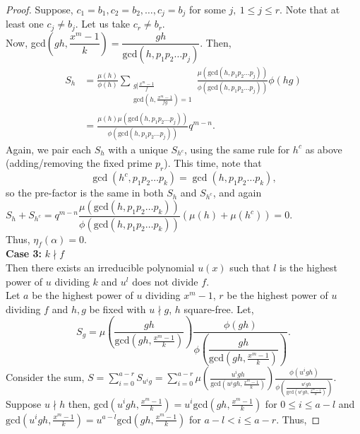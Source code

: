 \documentclass[12pt,a4paper]{article}
\theoremstyle{plain}
\theoremstyle{definition}
\numberwithin{equation}{section}
\begin{document}
\begin{proof}
        Suppose, $c_1=b_1, c_2 = b_2, \dots, c_j=b_j$ for some $j,~1\leq j \leq r$. Note that at least one $c_j \neq b_j$. Let us take $c_r \neq b_r$. \\
        Now, gcd$\left( gh , \dfrac{x^m-1}{k}\right) = \dfrac{gh}{\text{gcd}(h,p_1p_2\dots p_j)}$. Then,
        \begin{align*}
            S_h &= \frac{\mu(h)}{\phi(h)} \sum_{\substack{g\vert \frac{x^m-1}{f}\\\text{gcd}(h,\frac{x^m-1}{fg})=1}} \frac{\mu(\text{gcd}(h,p_1p_2\dots p_j))}{\phi(\text{gcd}(h,p_1p_2\dots p_j))} \phi(hg) \\
            &= \frac{\mu(h)\mu(\text{gcd}(h,p_1p_2\dots p_j))}{\phi(\text{gcd}(h,p_1p_2\dots p_j))}q^{m-n}.
        \end{align*}
        Again, we pair each $S_h$ with a unique $S_{h^c}$, using the same rule for $h^c$ as above (adding/removing the fixed prime $p_r$). This time, note that
        \[
        \gcd(h^c, p_1p_2\dots p_k) = \gcd(h, p_1p_2\dots p_k),
        \]
        so the pre-factor is the same in both $S_h$ and $S_{h^c}$, and again\\
        $S_h + S_{h^c} = q^{m-n} \dfrac{\mu(\text{gcd}(h,p_1p_2\dots p_k))}{\phi(\text{gcd}(h,p_1p_2\dots p_k))} (\mu(h)+\mu(h^c)) = 0$.\\
        Thus, $\eta_f(\alpha) = 0$.\\
        \textbf{Case 3:} $k \nmid f$\\
        Then there exists an irreducible polynomial $u(x)$ such that $l$ is the highest power of $u$ dividing $k$ and $u^l$ does not divide $f$.\\
        Let $a$ be the highest power of $u$ dividing $x^m-1$, $r$ be the highest power of $u$ dividing $f$ and $h, g$ be fixed with $u \nmid g$, $h$  square-free. Let,
        $$S_g = \mu\left(\dfrac{gh}{\text{gcd}(gh,\frac{x^m-1}{k})}\right)\dfrac{\phi(gh)}{\phi\left(\dfrac{gh}{\text{gcd}(gh,\frac{x^m-1}{k})}\right)}.$$
        Consider the sum, $S = \displaystyle \sum_{i=0}^{a-r}S_{u^ig} = \sum_{i=0}^{a-r} \mu\left(\frac{u^igh}{\text{gcd}(u^igh,\frac{x^m-1}{k})}\right)\frac{\phi(u^igh)}{\phi\left(\frac{u^igh}{\text{gcd}(u^igh,\frac{x^m-1}{k})}\right)}$. \\
        Suppose $u\nmid h$ then,  $\text{gcd}(u^igh,\frac{x^m-1}{k}) = u^i \text{gcd}(gh,\frac{x^m-1}{k})$ for $0 \leq i \leq a-l$ and $\text{gcd}(u^igh,\frac{x^m-1}{k}) = u^{a-l} \text{gcd}(gh,\frac{x^m-1}{k})$ for $a-l < i \leq a-r$. Thus,
        

\end{proof}
\end{document}
